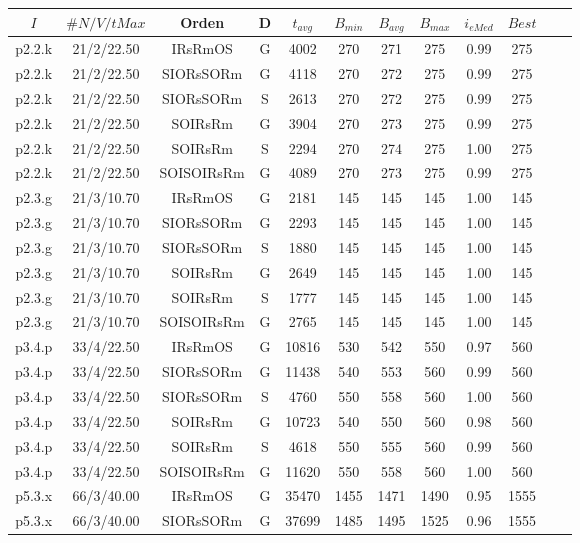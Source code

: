 \begin{table}
\begin{tabular}{ |c|c|c|c|c|c|c|c|c|c|c|c| } 
\hline
$I$ & $\# N/V/tMax$ & Orden & D & $t_{avg}$ & $B_{min}$ & $B_{avg}$ & $B_{max}$ & $i_{eMed}$ & $Best$ \\
\hline
p2.2.k & 21/2/22.50 & IRsRmOS & G & 4002 & 270 & 271 & 275 & 0.99 & 275 \\
p2.2.k & 21/2/22.50 & SIORsSORm & G & 4118 & 270 & 272 & 275 & 0.99 & 275 \\
p2.2.k & 21/2/22.50 & SIORsSORm & S & 2613 & 270 & 272 & 275 & 0.99 & 275 \\
p2.2.k & 21/2/22.50 & SOIRsRm & G & 3904 & 270 & 273 & 275 & 0.99 & 275 \\
p2.2.k & 21/2/22.50 & SOIRsRm & S & 2294 & 270 & 274 & 275 & 1.00 & 275 \\
p2.2.k & 21/2/22.50 & SOISOIRsRm & G & 4089 & 270 & 273 & 275 & 0.99 & 275 \\
p2.3.g & 21/3/10.70 & IRsRmOS & G & 2181 & 145 & 145 & 145 & 1.00 & 145 \\
p2.3.g & 21/3/10.70 & SIORsSORm & G & 2293 & 145 & 145 & 145 & 1.00 & 145 \\
p2.3.g & 21/3/10.70 & SIORsSORm & S & 1880 & 145 & 145 & 145 & 1.00 & 145 \\
p2.3.g & 21/3/10.70 & SOIRsRm & G & 2649 & 145 & 145 & 145 & 1.00 & 145 \\
p2.3.g & 21/3/10.70 & SOIRsRm & S & 1777 & 145 & 145 & 145 & 1.00 & 145 \\
p2.3.g & 21/3/10.70 & SOISOIRsRm & G & 2765 & 145 & 145 & 145 & 1.00 & 145 \\
p3.4.p & 33/4/22.50 & IRsRmOS & G & 10816 & 530 & 542 & 550 & 0.97 & 560 \\
p3.4.p & 33/4/22.50 & SIORsSORm & G & 11438 & 540 & 553 & 560 & 0.99 & 560 \\
p3.4.p & 33/4/22.50 & SIORsSORm & S & 4760 & 550 & 558 & 560 & 1.00 & 560 \\
p3.4.p & 33/4/22.50 & SOIRsRm & G & 10723 & 540 & 550 & 560 & 0.98 & 560 \\
p3.4.p & 33/4/22.50 & SOIRsRm & S & 4618 & 550 & 555 & 560 & 0.99 & 560 \\
p3.4.p & 33/4/22.50 & SOISOIRsRm & G & 11620 & 550 & 558 & 560 & 1.00 & 560 \\
p5.3.x & 66/3/40.00 & IRsRmOS & G & 35470 & 1455 & 1471 & 1490 & 0.95 & 1555 \\
p5.3.x & 66/3/40.00 & SIORsSORm & G & 37699 & 1485 & 1495 & 1525 & 0.96 & 1555 \\

\end{tabular}
\end{table}
